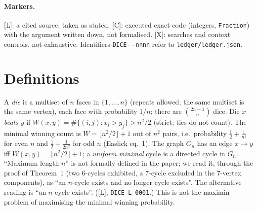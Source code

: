 \documentclass[10pt]{article}
\newcommand{\tier}[1]{\textsf{[#1]}}
\newcommand{\tL}{\tier{L}}
\newcommand{\tC}{\tier{C}}
\newcommand{\tX}{\tier{X}}
\begin{document}
\paragraph{Markers.} \tL{}: a cited source, taken as stated. \tC{}: executed exact code (integers, \texttt{Fraction}) with the argument written down, not formalised. \tX{}: searches and context controls, not exhaustive. Identifiers \texttt{DICE-$\cdot$-nnnn} refer to \texttt{ledger/ledger.json}.

\section{Definitions}\label{sec:def}
A \emph{die} is a multiset of $n$ faces in $\{1,\dots,n\}$ (repeats allowed; the same multiset is the same vertex), each face with probability $1/n$; there are $\binom{2n-1}{n}$ dice. Die $x$ \emph{beats} $y$ if $W(x,y)=\#\{(i,j):x_i>y_j\}>n^2/2$ (strict; ties do not count). The minimal winning count is $W=\lfloor n^2/2\rfloor+1$ out of $n^2$ pairs, i.e.\ probability $\tfrac12+\tfrac1{n^2}$ for even $n$ and $\tfrac12+\tfrac1{2n^2}$ for odd $n$ (Easlick eq.~1). The graph $G_n$ has an edge $x\to y$ iff $W(x,y)=\lfloor n^2/2\rfloor+1$; a \emph{uniform minimal} cycle is a directed cycle in $G_n$. ``Maximum length $n$'' is not formally defined in the paper; we read it, through the proof of Theorem~1 (two $6$-cycles exhibited, a $7$-cycle excluded in the $7$-vertex components), as ``an $n$-cycle exists and no longer cycle exists''. The alternative reading is ``an $n$-cycle exists''. (\tL{}, \texttt{DICE-L-0001}.) This is not the maximin problem of maximising the minimal winning probability.
\end{document}
